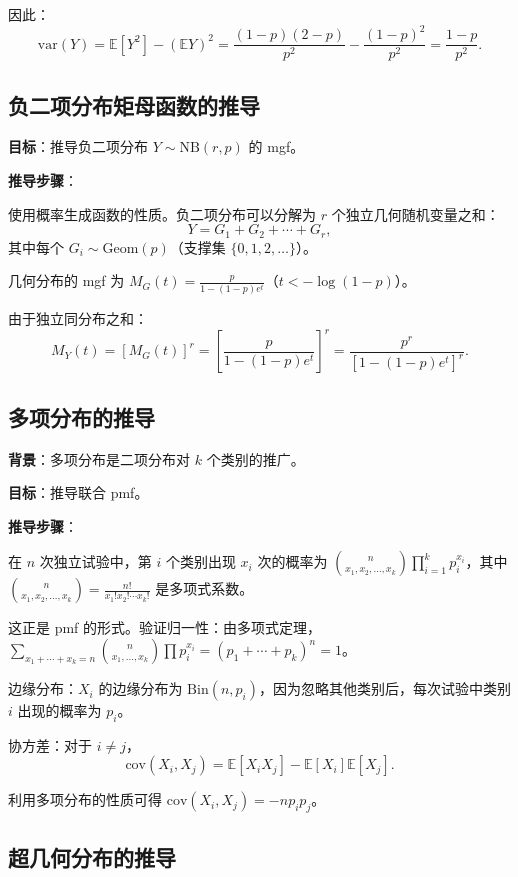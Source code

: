 因此：
\[
\text{var}(Y) = \mathbb{E}[Y^{2}] - (\mathbb{E}Y)^{2} = \frac{(1-p)(2-p)}{p^{2}} - \frac{(1-p)^{2}}{p^{2}} = \frac{1-p}{p^{2}}.
\]

\subsection{负二项分布矩母函数的推导}\label{sec:derivation-nb-mgf}

\textbf{目标}：推导负二项分布 $Y \sim \text{NB}(r, p)$ 的 mgf。

\textbf{推导步骤}：

使用概率生成函数的性质。负二项分布可以分解为 $r$ 个独立几何随机变量之和：
\[
Y = G_1 + G_2 + \cdots + G_r,
\]
其中每个 $G_i \sim \text{Geom}(p)$（支撑集 $\{0,1,2,\ldots\}$）。

几何分布的 mgf 为 $M_G(t) = \frac{p}{1 - (1-p)e^{t}}$（$t < -\log(1-p)$）。

由于独立同分布之和：
\[
M_Y(t) = [M_G(t)]^{r} = \left[\frac{p}{1 - (1-p)e^{t}}\right]^{r} = \frac{p^{r}}{[1 - (1-p)e^{t}]^{r}}.
\]

\subsection{多项分布的推导}\label{sec:derivation-multinomial}

\textbf{背景}：多项分布是二项分布对 $k$ 个类别的推广。

\textbf{目标}：推导联合 pmf。

\textbf{推导步骤}：

在 $n$ 次独立试验中，第 $i$ 个类别出现 $x_i$ 次的概率为 $\binom{n}{x_1, x_2, \ldots, x_k} \prod_{i=1}^{k} p_i^{x_i}$，其中 $\binom{n}{x_1, x_2, \ldots, x_k} = \frac{n!}{x_1! x_2! \cdots x_k!}$ 是多项式系数。

这正是 pmf 的形式。验证归一性：由多项式定理，$\sum_{x_1+\cdots+x_k=n} \binom{n}{x_1, \ldots, x_k} \prod p_i^{x_i} = (p_1 + \cdots + p_k)^{n} = 1$。

边缘分布：$X_i$ 的边缘分布为 $\text{Bin}(n, p_i)$，因为忽略其他类别后，每次试验中类别 $i$ 出现的概率为 $p_i$。

协方差：对于 $i \neq j$，
\[
\text{cov}(X_i, X_j) = \mathbb{E}[X_i X_j] - \mathbb{E}[X_i]\mathbb{E}[X_j].
\]

利用多项分布的性质可得 $\text{cov}(X_i, X_j) = -np_i p_j$。

\subsection{超几何分布的推导}\label{sec:derivation-hypergeometric}

